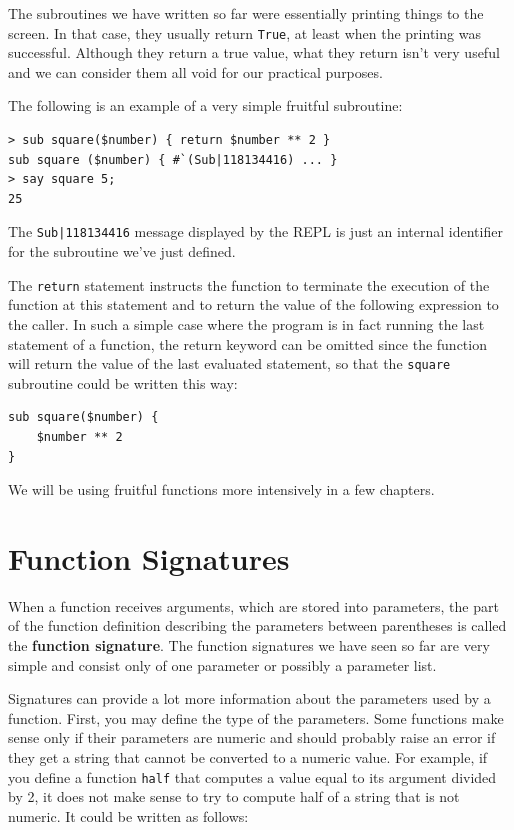 The subroutines we have written so far were essentially 
printing things to the screen. In that case, they 
usually return {\tt True}, at least when the printing 
was successful. Although they return a true value, what they 
return isn't very useful and we can consider them all void 
for our practical purposes.  

The following is an example of a very simple fruitful subroutine:

\begin{verbatim}
> sub square($number) { return $number ** 2 }
sub square ($number) { #`(Sub|118134416) ... }
> say square 5;
25
\end{verbatim}

The \verb'Sub|118134416' message displayed by the REPL is 
just an internal identifier for the subroutine we've just 
defined.

The {\tt return} statement instructs the function to terminate 
the execution of the function at this statement and to return 
the value of the following expression to the caller. In such a simple 
case where the program is in fact running the last statement 
of a function, the return keyword can be omitted since the function 
will return the value of the last evaluated statement, so that the 
{\tt square} subroutine could be written this way:
\begin{verbatim}
sub square($number) { 
    $number ** 2 
}
\end{verbatim}

We will be using fruitful functions more intensively in a 
few chapters.

\section{Function Signatures}

When a function receives arguments, which are stored into 
parameters, the part of the function 
definition describing the parameters between parentheses 
is called the {\bf function signature}. The function signatures 
we have seen so far are very simple and consist only of one 
parameter or possibly a parameter list.

Signatures can provide a lot more information about the 
parameters used by a function. First, you may define the 
type of the parameters. Some functions make sense only if their 
parameters are numeric and should probably raise an error if 
they get a string that cannot be converted to a numeric value. 
For example, if you define a function {\tt half} that computes 
a value equal to its argument divided by 2, it does not make 
sense to try to compute half of a string that is not numeric. 
It could be written as follows:

